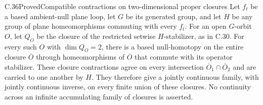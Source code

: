 \begin{claim}{C.36}{Proved}{Compatible contractions on two-dimensional proper closures}
Let $f_t$ be a based ambient-null plane loop, let $G$ be
its generated group, and let $H$ be any group of plane
homeomorphisms commuting with every $f_t$.
For an open $G$-orbit $O$, let $Q_O$ be the closure of
the restricted setwise $H$-stabilizer, as in C.30.
For every such $O$ with $\dim Q_O=2$, there is a based
null-homotopy on the entire closure $\overline O$
through homeomorphisms of $\overline O$ that commute
with its operator stabilizer.
These closure contractions agree on every intersection
$\overline O_1\cap\overline O_2$ and are carried to one
another by $H$. They therefore give a jointly continuous
family, with jointly continuous inverse, on every
finite union of these closures.
No continuity across an infinite accumulating family
of closures is asserted.
\end{claim}
